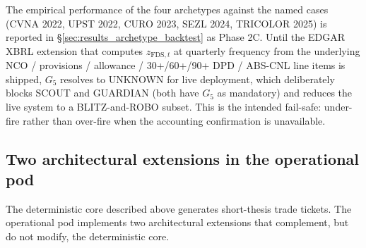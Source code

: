 \documentclass[11pt,a4paper]{article}
\begin{document}
The empirical performance of the four archetypes against the named cases (CVNA 2022, UPST 2022, CURO 2023, SEZL 2024, TRICOLOR 2025) is reported in §\ref{sec:results_archetype_backtest} as Phase 2C. Until the EDGAR XBRL extension that computes $z_{\text{FDS},t}$ at quarterly frequency from the underlying NCO / provisions / allowance / 30+/60+/90+ DPD / ABS-CNL line items is shipped, $G_5$ resolves to UNKNOWN for live deployment, which deliberately blocks SCOUT and GUARDIAN (both have $G_5$ as mandatory) and reduces the live system to a BLITZ-and-ROBO subset. This is the intended fail-safe: under-fire rather than over-fire when the accounting confirmation is unavailable.

\subsection{Two architectural extensions in the operational pod}\label{sec:extensions}

The deterministic core described above generates short-thesis trade tickets. The operational pod implements two architectural extensions that complement, but do not modify, the deterministic core.
\end{document}
